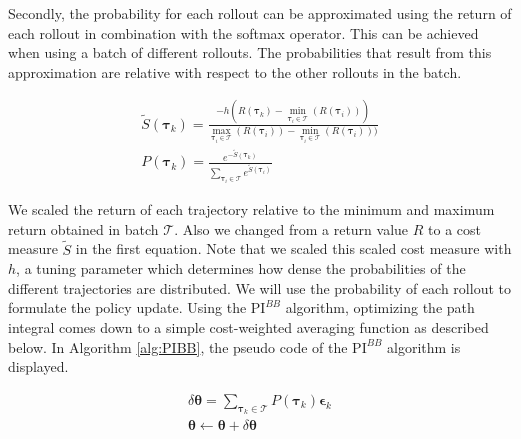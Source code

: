 \documentclass[mscThesis.tex]{subfiles}
\begin{document}
Secondly, the probability for each rollout can be approximated using the return of each rollout in combination with the softmax operator. This can be achieved when using a batch of different rollouts. The probabilities that result from this approximation are relative with respect to the other rollouts in the batch.

\begin{gather*}
\tilde{S}(\bm{\tau}_k) = \frac{-h (R(\bm{\tau}_k) - \min_{\bm{\tau}_i \in \mathcal{T}} (R(\bm{\tau}_i)) )}{\max_{\bm{\tau}_i \in \mathcal{T}} (R(\bm{\tau}_i)) - \min_{\bm{\tau}_i \in \mathcal{T}} (R(\bm{\tau}_i)) )} \\
P(\bm{\tau}_{k}) = \frac{e^{-\tilde{S}(\bm{\tau}_k)}}{\sum_{\bm{\tau}_i \in \mathcal{T}} e^{\tilde{S}(\bm{\tau}_i)}}
\label{eq:PIBBProb}
\end{gather*}

We scaled the return of each trajectory relative to the minimum and maximum return obtained in batch $\mathcal{T}$. Also we changed from a return value $R$ to a cost measure $\tilde{S}$ in the first equation. Note that we scaled this scaled cost measure with $h$, a tuning parameter which determines how dense the probabilities of the different trajectories are distributed. We will use the probability of each rollout to formulate the policy update. Using the $\text{PI}^{BB}$ algorithm, optimizing the path integral comes down to a simple cost-weighted averaging function as described below. In Algorithm \ref{alg:PIBB}, the pseudo code of the $\text{PI}^{BB}$ algorithm is displayed.

\begin{gather*}
\delta \bm{\theta} = \sum_{\bm{\tau}_k \in \mathcal{T}} P(\bm{\tau}_k) \bm{\epsilon}_k \\
\bm{\theta} \gets \bm{\theta} + \delta \bm{\theta}
\end{gather*}
\end{document}
